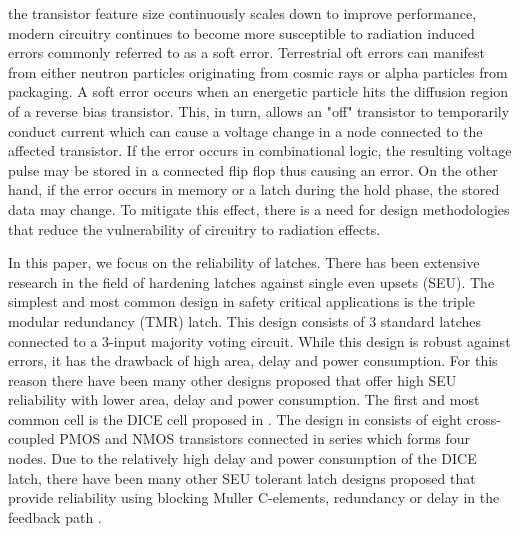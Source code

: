 
% 
 the transistor feature size continuously scales down to improve performance, modern circuitry continues to become more susceptible to radiation induced errors commonly referred to as a soft error. Terrestrial oft errors can manifest from either neutron particles originating from cosmic rays or alpha particles from packaging. A soft error occurs when an energetic particle hits the diffusion region of a reverse bias transistor. This, in turn, allows an "off" transistor to temporarily conduct current which can cause a voltage change in a node connected to the affected transistor. If the error occurs in combinational logic, the resulting voltage pulse may be stored in a connected flip flop thus causing an error. On the other hand, if the error occurs in memory or a latch during the hold phase, the stored data may change. To mitigate this effect, there is a need for design methodologies that reduce the vulnerability of circuitry to radiation effects.

In this paper, we focus on the reliability of latches. There has been extensive research in the field of hardening latches against single even upsets (SEU). The simplest and most common design in safety critical applications is the triple modular redundancy (TMR) latch. This design consists of 3 standard latches connected to a 3-input majority voting circuit. While this design is robust against errors, it has the drawback of high area, delay and power consumption. For this reason there have been many other designs proposed that offer high SEU reliability with lower area, delay and power consumption. The first and most common cell is the DICE cell proposed in \cite{DICE}. The design in \cite{DICE} consists of eight cross-coupled PMOS and NMOS transistors connected in series which forms four nodes. Due to the relatively high delay and power consumption of the DICE latch, there have been many other SEU tolerant latch designs proposed that provide reliability using blocking Muller C-elements, redundancy or delay in the feedback path \cite{HIPER, FERST, Hazucha, SEMULatch, Multivdd, BISER, NicoFeedback}.

